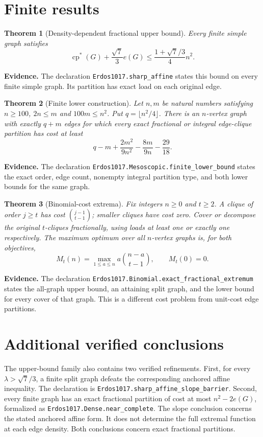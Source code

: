 \documentclass[11pt]{article}
\newtheorem{theorem}{Theorem}
\newcommand{\cp}{\operatorname{cp}}
\newcommand{\status}[1]{\par\noindent\textcolor{blue!45!black}{\textbf{Evidence.} #1}\par}
\begin{document}
\section{Finite results}
\begin{theorem}[Density-dependent fractional upper bound]
Every finite simple graph satisfies
\[
 \cp^*(G)+\frac{\sqrt7}{3}e(G)\leq
 \frac{1+\sqrt7/3}{4}n^2.
\]
\end{theorem}
\status{The declaration \texttt{Erdos1017.sharp\_affine} states this bound on every finite simple graph. Its partition has exact load on each original edge.}
\begin{theorem}[Finite lower construction]
Let $n,m$ be natural numbers satisfying $n\geq100$, $2n\leq m$ and $100m\leq n^2$. Put $q=\lfloor n^2/4\rfloor$. There is an $n$-vertex graph with exactly $q+m$ edges for which every exact fractional or integral edge-clique partition has cost at least
\[
q-m+\frac{2m^2}{9n^2}-\frac{8m}{9n}-\frac{29}{18}.
\]
\end{theorem}
\status{The declaration \texttt{Erdos1017.Mesoscopic.finite\_lower\_bound} states the exact order, edge count, nonempty integral partition type, and both lower bounds for the same graph.}
\begin{theorem}[Binomial-cost extrema]
Fix integers $n\geq0$ and $t\geq2$. A clique of order $j\geq t$ has cost $\binom{j-1}{t-1}$; smaller cliques have cost zero. Cover or decompose the original $t$-cliques fractionally, using loads at least one or exactly one respectively. The maximum optimum over all $n$-vertex graphs is, for both objectives,
\[
 M_t(n)=\max_{1\leq a\leq n} a\binom{n-a}{t-1},\qquad M_t(0)=0.
\]
\end{theorem}
\status{The declaration \texttt{Erdos1017.Binomial.exact\_fractional\_extremum} states the all-graph upper bound, an attaining split graph, and the lower bound for every cover of that graph. This is a different cost problem from unit-cost edge partitions.}
\section{Additional verified conclusions}
The upper-bound family also contains two verified refinements. First, for every $\lambda>\sqrt7/3$, a finite split graph defeats the corresponding anchored affine inequality. The declaration is \texttt{Erdos1017.sharp\_affine\_slope\_barrier}. Second, every finite graph has an exact fractional partition of cost at most $n^2-2e(G)$, formalized as \texttt{Erdos1017.Dense.near\_complete}. The slope conclusion concerns the stated anchored affine form. It does not determine the full extremal function at each edge density. Both conclusions concern exact fractional partitions.
\end{document}
